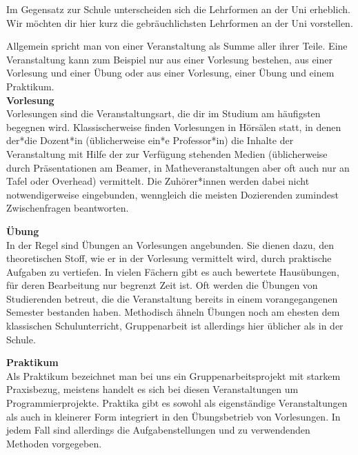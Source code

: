 {Im Gegensatz zur Schule unterscheiden sich die Lehrformen an der Uni erheblich. Wir möchten dir hier kurz die gebräuchlichsten Lehrformen an der Uni vorstellen.}
{Allgemein spricht man von einer Veranstaltung als Summe aller ihrer Teile. Eine Veranstaltung kann zum Beispiel nur aus einer Vorlesung bestehen, aus einer Vorlesung und einer Übung oder aus einer Vorlesung, einer Übung und einem Praktikum.\\

    \textbf{Vorlesung}\\

    Vorlesungen sind die Veranstaltungsart, die dir im Studium am häufigsten begegnen wird. Klassischerweise finden Vorlesungen in Hörsälen statt, in denen der*die Dozent*in (üblicherweise ein*e Professor*in) die Inhalte der Veranstaltung mit Hilfe der zur Verfügung stehenden Medien (üblicherweise durch Präsentationen am Beamer, in Matheveranstaltungen aber oft auch nur an Tafel oder Overhead) vermittelt. Die Zuhörer*innen werden dabei nicht notwendigerweise eingebunden, wenngleich die meisten Dozierenden zumindest Zwischenfragen beantworten.

    \textbf{Übung}\\

    In der Regel sind Übungen an Vorlesungen angebunden. Sie dienen dazu, den theoretischen Stoff, wie er in der Vorlesung vermittelt wird, durch praktische Aufgaben zu vertiefen. In vielen Fächern gibt es auch bewertete Hausübungen, für deren Bearbeitung nur begrenzt Zeit ist. Oft werden die Übungen von Studierenden betreut, die die Veranstaltung bereits in einem vorangegangenen Semester bestanden haben. Methodisch ähneln Übungen noch am ehesten dem klassischen Schulunterricht, Gruppenarbeit ist allerdings hier üblicher als in der Schule.

    \newpage

    \textbf{Praktikum}\\

    Als Praktikum bezeichnet man bei uns ein Gruppenarbeitsprojekt mit starkem Praxisbezug, meistens handelt es sich bei diesen Veranstaltungen um Programmierprojekte. Praktika gibt es sowohl als eigenständige Veranstaltungen als auch in kleinerer Form integriert in den Übungsbetrieb von Vorlesungen. In jedem Fall sind allerdings die Aufgabenstellungen und zu verwendenden Methoden vorgegeben.

}
